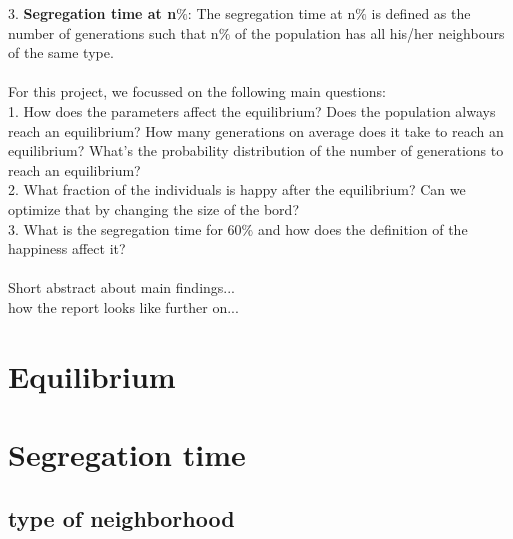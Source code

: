 \documentclass{article}
\begin{document}
3. \textbf{Segregation time at n$\%$}: The segregation time at n$\%$ is defined as the number of generations such that n$\%$ of the population has all his/her neighbours of the same type.
\\
\\
For this project, we focussed on the following main questions:\\
1. How does the parameters affect the equilibrium? Does the population always reach an equilibrium? How many generations on average does it take to reach an equilibrium? What's the probability distribution of the number of generations to reach an equilibrium?\\
2. What fraction of the individuals is happy after the equilibrium? Can we optimize that by changing the size of the bord?\\
3. What is the segregation time for 60$\%$ and how does the definition of the happiness affect it?\\
\\
Short abstract about main findings...\\
how the report looks like further on...
\section{Equilibrium}

\section{Segregation time}

\subsection{type of neighborhood}
\end{document}
